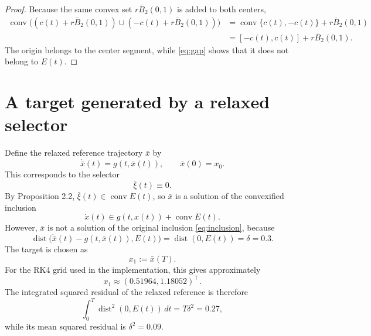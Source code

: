 \documentclass[11pt]{article}
\newcommand{\B}{\overline{B}_2(0,1)}
\newcommand{\dist}{\operatorname{dist}}
\newcommand{\conv}{\operatorname{conv}}
\begin{document}
\begin{proof}
Because the same convex set $r\B$ is added to both centers,
\begin{align}
    \conv\bigl((c(t)+r\B)\cup(-c(t)+r\B)\bigr)
    &=\conv\{c(t),-c(t)\}+r\B\\
    &=[-c(t),c(t)]+r\B.
\end{align}
The origin belongs to the center segment, while \eqref{eq:gap} shows that it does not belong to $E(t)$.
\end{proof}

\section{A target generated by a relaxed selector}

Define the relaxed reference trajectory $\bar x$ by
\begin{equation}
    \dot{\bar x}(t)=g(t,\bar x(t)),
    \qquad \bar x(0)=x_0.
    \label{eq:relaxed_trajectory}
\end{equation}
This corresponds to the selector
\begin{equation}
    \bar\xi(t)\equiv 0.
\end{equation}
By Proposition 2.2, $\bar\xi(t)\in\conv E(t)$, so $\bar x$ is a solution of the convexified inclusion
\begin{equation}
    \dot x(t)\in g(t,x(t))+\conv E(t).
    \label{eq:convexified}
\end{equation}
However, $\bar x$ is not a solution of the original inclusion \eqref{eq:inclusion}, because
\begin{equation}
    \dist\bigl(\dot{\bar x}(t)-g(t,\bar x(t)),E(t)\bigr)
    =\dist(0,E(t))=\delta=0.3.
    \label{eq:relaxed_residual}
\end{equation}
The target is chosen as
\begin{equation}
    x_1:=\bar x(T).
    \label{eq:target}
\end{equation}
For the RK4 grid used in the implementation, this gives approximately
\begin{equation}
    x_1\approx(0.51964,1.18052)^\top.
\end{equation}
The integrated squared residual of the relaxed reference is therefore
\begin{equation}
    \int_0^T \dist^2(0,E(t))\,dt
    =T\delta^2
    =0.27,
    \label{eq:relaxed_J}
\end{equation}
while its mean squared residual is $\delta^2=0.09$.
\end{document}
